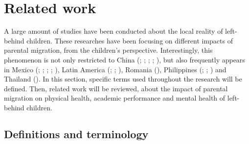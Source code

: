 \section{Related work}
\label{related-work}

A large amount of studies have been conducted about the local reality of left-behind children. These researches have been focusing on different impacts of parental migration, from the children's perspective. Interestingly, this phenomenon is not only restricted to China (\cite{song2009health}; \cite{he2012depression}; \cite{guo2017effect}; \cite{fan2010emotional}; \cite{bai2017effect}), but also frequently appears in Mexico (\cite{sawyer2016money}; \cite{kanaiaupuni2000reframing}; \cite{hildebrandt2005effects}; \cite{fernandez1998fathers}; \cite{dreby2007children}), Latin America (\cite{mundial2006development}; \cite{acosta2007impact}; \cite{anton2010impact}), Romania (\cite{botezat2014impact}), Philippines (\cite{yang2008international}; \cite{cortes2015feminization}; \cite{arguillas2010impact}) and Thailand (\cite{jampaklay2006parental}). In this section, specific terms used throughout the research will be defined. Then, related work will be reviewed, about the impact of parental migration on physical health, academic performance and mental health of left-behind children. 

\subsection{Definitions and terminology}

